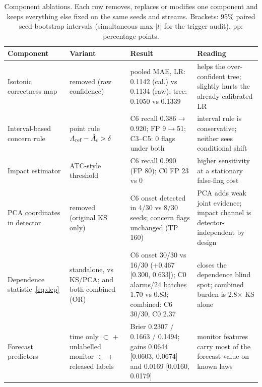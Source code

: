 \begin{table}[t]
\centering
\caption{Component ablations. Each row removes, replaces or modifies one component and keeps everything else fixed on the same seeds and streams. Brackets: 95\% paired seed-bootstrap intervals (simultaneous max-$|t|$ for the trigger audit). pp: percentage points.}
\label{tab:ablation}
\setlength{\tabcolsep}{4pt}
\begin{tabular}{L{3.3cm}L{4.2cm}L{4.6cm}L{4.4cm}}
\toprule
Component & Variant & Result & Reading \\
\midrule
Isotonic correctness map & removed (raw confidence) & pooled MAE, LR: 0.1142 (cal.) vs 0.1134 (raw); tree: 0.1050 vs 0.1339 & helps the over-confident tree; slightly hurts the already calibrated LR \\
Interval-based concern rule & point rule $A_{\mathrm{ref}}-\hat{A}_t>\delta$ & C6 recall 0.386$\to$0.920; FP 9$\to$51; C3--C5: 0 flags under both & interval rule is conservative; neither sees conditional shift \\
Impact estimator & ATC-style threshold & C6 recall 0.990 (FP 80); C0 FP 23 vs 0 & higher sensitivity at a stationary false-flag cost \\
PCA coordinates in detector & removed (original KS only) & C6 onset detected in 4/30 vs 8/30 seeds; concern flags unchanged (TP 160) & PCA adds weak joint evidence; impact channel is detector-independent by design \\
Dependence statistic~\eqref{eq:dep} & standalone, vs KS/PCA; and both combined (OR) & C6 onset 30/30 vs 16/30 (+0.467 [0.300, 0.633]); C0 alarms/24 batches 1.70 vs 0.83; combined: C6 30/30, C0 2.37 & closes the dependence blind spot; combined burden is 2.8$\times$ KS alone \\
Forecast predictors & time only $\subset$ + unlabelled monitor $\subset$ + released labels & Brier 0.2307 / 0.1663 / 0.1494; gains 0.0644 [0.0603, 0.0674] and 0.0169 [0.0160, 0.0179] & monitor features carry most of the forecast value on known laws \\

\end{tabular}
\end{table}
